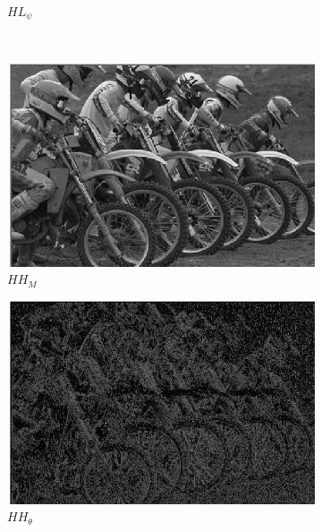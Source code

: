 \begin{figure}
\begin{subfigure}[b]{0.23\textwidth}
         \caption{$HL_{\psi}$}
         \label{fig:qwt12}
     \end{subfigure}
     \\
     \begin{subfigure}[b]{0.23\textwidth}
         \centering
         \includegraphics[width=\textwidth]{./figs/m_2_2_q}
         \caption{$HH_M$}
         \label{fig:qwt13}
     \end{subfigure}
     \begin{subfigure}[b]{0.23\textwidth}
         \centering
         \includegraphics[width=\textwidth]{./figs/o_2_2_1_q}
         \caption{$HH_{\theta}$}
         \label{fig:qwt14}
     \end{subfigure}
     \begin{subfigure}[b]{0.23\textwidth}
         \centering

\end{subfigure}
\end{figure}
